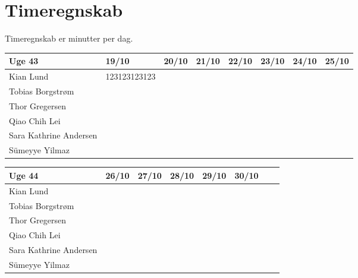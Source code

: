\newpage
\section{Timeregnskab}
Timeregnskab er minutter per dag.

\begin{center}
\begin{tabular}{ | m{12em} | m{1cm}| m{1cm} | m{1cm} | m{1cm} | m{1cm} | m{1cm} | m{1cm} |} 
\hline
Uge 43 & 19/10 & 20/10 & 21/10 & 22/10 & 23/10 & 24/10 & 25/10\\ 
\hline
Kian Lund & 123123123123 &  &  &  &  &  & \\ 
\hline
Tobias Borgstrøm &  &  &  &  &  &  & \\ 
\hline
Thor Gregersen & &  & & & &  & \\ 
\hline
Qiao Chih Lei &  &  &  &  &  &  & \\ 
\hline
Sara Kathrine Andersen &  &  &  &  &  &  & \\ 
\hline
Sümeyye Yilmaz &  &  &  &  &  &  & \\ 
\hline
\end{tabular}
\end{center}

\begin{center}
\begin{tabular}{ | m{12em} | m{1cm}| m{1cm} | m{1cm} | m{1cm} | m{1cm} | m{1cm} | m{1cm} | } 
\hline
        Uge 44 & 26/10 & 27/10 & 28/10 & 29/10 & 30/10 & &\\ 
\hline
Kian Lund & &  &  & & & &  \\ 
\hline
Tobias Borgstrøm & & & & & & &  \\ 
\hline
Thor Gregersen & & & & & & & \\ 
\hline
Qiao Chih Lei &  &  & & &   &  & \\ 
\hline
Sara Kathrine Andersen &  &  &  &  & &  & \\ 
\hline
Sümeyye Yilmaz & & & & & & & \\ 
\hline
\end{tabular}
\end{center}